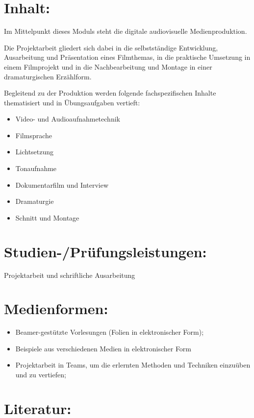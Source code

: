\section{Inhalt:}\label{inhalt-2}

Im Mittelpunkt dieses Moduls steht die digitale audiovisuelle
Medienproduktion.

Die Projektarbeit gliedert sich dabei in die selbstständige Entwicklung,
Ausarbeitung und Präsentation eines Filmthemas, in die praktische
Umsetzung in einem Filmprojekt und in die Nachbearbeitung und Montage in
einer dramaturgischen Erzählform.

Begleitend zu der Produktion werden folgende fachspezifischen Inhalte
thematisiert und in Übungsaufgaben vertieft:

\begin{itemize}
\tightlist
\item
  Video- und Audioaufnahmetechnik
\item
  Filmsprache
\item
  Lichtsetzung
\item
  Tonaufnahme
\item
  Dokumentarfilm und Interview
\item
  Dramaturgie
\item
  Schnitt und Montage
\end{itemize}

\section{Studien-/Prüfungsleistungen:}\label{studien-pruxfcfungsleistungen-2}

Projektarbeit und schriftliche Ausarbeitung

\section{Medienformen:}\label{medienformen-2}

\begin{itemize}
\tightlist
\item
  Beamer-gestützte Vorlesungen (Folien in elektronischer Form);
\item
  Beispiele aus verschiedenen Medien in elektronischer Form
\item
  Projektarbeit in Teams, um die erlernten Methoden und Techniken
  einzuüben und zu vertiefen;
\end{itemize}

\section{Literatur:}\label{literatur-2}

